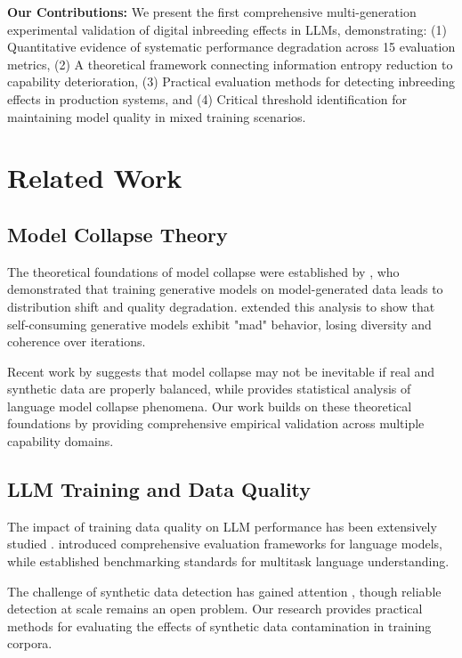\documentclass{article}
\begin{document}
\textbf{Our Contributions:} We present the first comprehensive multi-generation experimental validation of digital inbreeding effects in LLMs, demonstrating: (1) Quantitative evidence of systematic performance degradation across 15 evaluation metrics, (2) A theoretical framework connecting information entropy reduction to capability deterioration, (3) Practical evaluation methods for detecting inbreeding effects in production systems, and (4) Critical threshold identification for maintaining model quality in mixed training scenarios.

\section{Related Work}

\subsection{Model Collapse Theory}

The theoretical foundations of model collapse were established by \citet{shumailov2023curse}, who demonstrated that training generative models on model-generated data leads to distribution shift and quality degradation. \citet{alemohammad2023self} extended this analysis to show that self-consuming generative models exhibit "mad" behavior, losing diversity and coherence over iterations.

Recent work by \citet{gerstgrasser2024model} suggests that model collapse may not be inevitable if real and synthetic data are properly balanced, while \citet{seddik2024bad} provides statistical analysis of language model collapse phenomena. Our work builds on these theoretical foundations by providing comprehensive empirical validation across multiple capability domains.

\subsection{LLM Training and Data Quality}

The impact of training data quality on LLM performance has been extensively studied \citep{hoffmann2022training,muennighoff2022crosslingual}. \citet{liang2022holistic} introduced comprehensive evaluation frameworks for language models, while \citet{hendrycks2020measuring} established benchmarking standards for multitask language understanding.

The challenge of synthetic data detection has gained attention \citep{solaiman2019release,jawahar2020automatic}, though reliable detection at scale remains an open problem. Our research provides practical methods for evaluating the effects of synthetic data contamination in training corpora.
\end{document}
